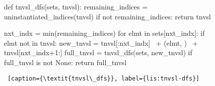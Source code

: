 \begin{figure}[htb]
    \centering
\begin{minipage}[c]{0.45\textwidth}
\begin{python1}  
def tnvsl_dfs(sets, tnvsl):
  remaining_indices = uninstantiated_indices(tnvsl)
  if not remaining_indices: return tnvsl

  nxt_indx = min(remaining_indices)
  for elmt in sets[nxt_indx]:
    if elmt not in tnvsl:
      new_tnvsl = tnvsl[:nxt_indx] \
                  + (elmt, ) \
                  + tnvsl[nxt_indx+1:]
      full_tnvsl = tnvsl_dfs(sets, new_tnvsl)
      if full_tnvsl is not None: return full_tnvsl
\end{python1}\linv
\begin{lstlisting} [caption={\textit{tnvsl\_dfs}}, label={lis:tnvsl-dfs}]
\end{lstlisting}
\end{minipage}\linv
\end{figure}

